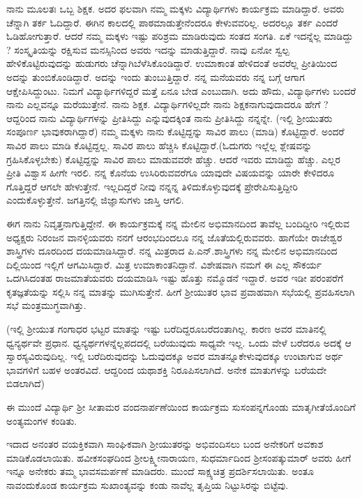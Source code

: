 {ನಾನು ಮೂಲತಃ ಒಬ್ಬ ಶಿಕ್ಷಕ. ಅದರ ಫಲವಾಗಿ ನಮ್ಮ ಮಕ್ಕಳು ವಿದ್ಯಾರ್ಥಿಗಳು ಕಾರ್ಯಕ್ರಮ ಮಾಡಿದ್ದಾರೆ. ಅವರು ಚೆನ್ನಾಗಿ ತರ್ಕ ಓದಿದ್ದಾರೆ. ಈಗಿನ ಕಾಲದಲ್ಲಿ ಪಾಠಮಾಡುತ್ತೇನೆಂದರೂ ಕೇಳುವವರಿಲ್ಲ. ಅದರಲ್ಲೂ ತರ್ಕ ಎಂದರೆ ಓಡಿಹೋಗು\-ತ್ತಾರೆ. ಆದರೆ ನಮ್ಮ ಮಕ್ಕಳು ಇಷ್ಟು ಪರಿಶ್ರಮ ಮಾಡಿರುವುದು ಸಂತದ ಸಂಗತಿ. ಏಕೆ ಇದನ್ನೆಲ್ಲ ಮಾಡಿದ್ದು ? ಸಂಸ್ಕೃತಿಯನ್ನು ರಕ್ಷಿಸುವ ಮನಸ್ಸಿನಿಂದ ಅವರು ಇದನ್ನು ಮಾಡುತ್ತಿದ್ದಾರೆ. ನಾವು ಏನೋ ಸ್ವಲ್ಪ ಹೇಳಿಕೊಟ್ಟಿರುವುದನ್ನು ಹುಡುಗರು ಚೆನ್ನಾಗಿ\break ಬೆಳೆಸಿಕೊಂಡಿದ್ದಾರೆ. ಉಮಾಕಾಂತ ಹೇಳಿದಂತೆ ಅವರೆಲ್ಲ ಪ್ರೀತಿಯಿಂದ ಅದನ್ನು ತುಂಬಿಕೊಂಡಿದ್ದಾರೆ. ಅದನ್ನು ಇಂದು ತುಂಬುತ್ತಿದ್ದಾರೆ. ನನ್ನ ಮನೆಯವರು ನನ್ನ ಬಗ್ಗೆ ಆಗಾಗ ಆಕ್ಷೇಪಿಸಿದ್ದುಂಟು. ನಿಮಗೆ ವಿದ್ಯಾರ್ಥಿಗಳಿದ್ದರೆ ಮತ್ತೆ ಏನೂ ಬೇಡ ಎಂಬುದಾಗಿ. ಅದು ಹೌದು, ವಿದ್ಯಾರ್ಥಿಗಳು ಬಂದರೆ ನಾನು ಎಲ್ಲವನ್ನೂ ಮರೆಯುತ್ತೇನೆ. ನಾನು ಶಿಕ್ಷಕ. ವಿದ್ಯಾರ್ಥಿಗಳಿಲ್ಲದೇ ನಾನು ಶಿಕ್ಷಕನಾಗುವುದಾದರೂ ಹೇಗೆ ? ಆದ್ದರಿಂದ ನಾನು ವಿದ್ಯಾರ್ಥಿಗಳನ್ನು ಪ್ರೀತಿಸಿದ್ದು ಎನ್ನುವುದಕ್ಕಿಂತ ನಾನು ಪ್ರೀತಿಸಿದ್ದು ನನ್ನನ್ನೇ. (ಇಲ್ಲಿ ಶ್ರೀಯುತರು ಸಂಪೂರ್ಣ ಭಾವುಕರಾಗಿದ್ದಾರೆ) ನಮ್ಮ ಮಕ್ಕಳು ನಾನು ಕೊಟ್ಟಿದ್ದನ್ನು ಸಾವಿರ ಪಾಲು (ಮಾಡಿ) ಕೊಟ್ಟಿದ್ದಾರೆ. ಅಂದರೆ ಸಾವಿರ ಪಾಲು ಮಾಡಿ \hbox{ಕೊಟ್ಟಿದ್ದಲ್ಲ}. ಸಾವಿರ ಪಾಲು ಹೆಚ್ಚಿಸಿ ಕೊಟ್ಟಿದ್ದಾರೆ.(ಓದುಗರು ಇಲ್ಲೆಲ್ಲ ಶ್ಲೇಷವನ್ನು ಗ್ರಹಿಸಿಕೊಳ್ಳ\-ಬೇಕು) ಕೊಟ್ಟಿದ್ದನ್ನು ಸಾವಿರ ಪಾಲು ಮಾಡುವವರೇ ಹೆಚ್ಚು. ಆದರೆ ಇವರು ಮಾಡಿದ್ದು ಹೆಚ್ಚು. ಎಲ್ಲರ ಪ್ರೀತಿ ವಿಶ್ವಾಸ ಹೀಗೇ ಇರಲಿ. ನನ್ನ ಕೊನೆಯ ಉಸಿರಿರುವ\-ವರೆಗೂ ಯಾವುದೇ ವಿಷಯವನ್ನು ಯಾರೇ ಕೇಳಿದರೂ ಗೊತ್ತಿದ್ದರೆ ಆಗಲೇ ಹೇಳುತ್ತೇನೆ. ಇಲ್ಲದಿದ್ದರೆ ನೀವು ನನ್ನನ್ನ ತಿಳಿದುಕೊಳ್ಳುವುದಕ್ಕೆ ಪ್ರೇರೇಪಿಸುತ್ತಿದ್ದೀರಿ ಎಂದುಕೊಳ್ಳುತ್ತೇನೆ. ಜಗತ್ತಿನಲ್ಲಿ ಜಿಜ್ಞಾಸುಗಳು ಜಾಸ್ತಿ ಆಗಲಿ. 
\vskip 4pt

ಈಗ ನಾನು ನಿವೃತ್ತನಾಗುತ್ತಿದ್ದೇನೆ. ಈ ಕಾರ್ಯಕ್ರಮಕ್ಕೆ ನನ್ನ ಮೇಲಿನ ಅಭಿಮಾನದಿಂದ ತಾವೆಲ್ಲ  ಬಂದಿದ್ದೀರಿ ಇಲ್ಲಿರುವ ಅಧ್ಯಕ್ಷರು ನಿರಂಜನ ವಾನಳ್ಳಿಯವರು ನನಗೆ ಆರಂಭದಿಂದಲೂ ನನ್ನ ಜೊತೆಯಲ್ಲಿರುವವರು. ಹಾಗೆಯೇ ರಾಜೇಶ್ವರ ಶಾಸ್ತ್ರಿಗಳು ದೂರದಿಂದ ದಯಮಾಡಿಸಿದ್ದಾರೆ. ನನ್ನ ಮಿತ್ರರಾದ ಪಿ.ಎನ್.ಶಾಸ್ತ್ರಿಗಳು ನನ್ನ ಮೇಲಿನ ಅಭಿಮಾನದಿಂದ ದಿಲ್ಲಿಯಿಂದ ಇಲ್ಲಿಗೆ ಆಗಮಿಸಿದ್ದಾರೆ. ಮಿತ್ರ ಉಮಾಕಾಂತನಿದ್ದಾನೆ. ವಿಶೇಷವಾಗಿ ನಮಗೆ ಈ ಎಲ್ಲ ಸೌಕರ್ಯ ಒದಗಿಸಿದಂತಹ ರಾಜಮಾತೆಯವರು ದಯಮಾಡಿಸಿ ಇಷ್ಟು ಹೊತ್ತು ನಮ್ಮೊಡನೆ ಇದ್ದಾರೆ. ಅವರ ಇಡೀ ಪರಂಪರೆಗೆ ಕೃತಜ್ಞತೆಯನ್ನು ಸಲ್ಲಿಸಿ ನನ್ನ ಮಾತನ್ನು ಮುಗಿಸುತ್ತೇನೆ. \enginline{-} ಹೀಗೆ ಶ್ರೀಯುತರ ಭಾವ ಪ್ರವಾಹವಾಗಿ ಸಭೆಯಲ್ಲಿ ಪ್ರವಹಿಸಲಾಗಿ ಸಭೆ ಮಂತ್ರಮುಗ್ಧವಾಗಿತ್ತು.
\vskip 4pt

(ಇಲ್ಲಿ ಶ್ರೀಯುತ ಗಂಗಾಧರ ಭಟ್ಟರ ಮಾತನ್ನು ಇಷ್ಟು ಬರೆದಿದ್ದರೂ\break ಬರೆದಂತಾಗಿಲ್ಲ. ಕಾರಣ ಅವರ ಮಾತಿನಲ್ಲಿ ಧ್ವನ್ಯರ್ಥವೇ ಪ್ರಧಾನ. ಧ್ವನ್ಯರ್ಥಗಳನ್ನೆಲ್ಲ\break ಪದದಲ್ಲಿ ಬರೆಯುವುದು ಸಾಧ್ಯವೇ ಇಲ್ಲ. ಒಂದು ವೇಳೆ ಬರೆದರೂ ಅದಕ್ಕೆ ಆ ಸ್ವಾರಸ್ಯ\-ವಿರುವುದಿಲ್ಲ. ಇಲ್ಲಿ ಬರೆದಿರುವುದನ್ನು ಓದುವುದಕ್ಕೂ ಅವರ ಮಾತನ್ನೂ\break ಕೇಳು\-ವುದಕ್ಕೂ ಉಂಟಾಗುವ ಅರ್ಥ ಭಾವಗಳಿಗೆ ಬಹಳ ಅಂತರವಿದೆ. ಆದ್ದರಿಂದ ಯಥಾಶಕ್ತಿ ನಿರೂಪಿಸಲಾಗಿದೆ. ಅನೇಕ ಮಾತುಗಳನ್ನು ಬರೆಯದೇ ಬಿಡಲಾಗಿದೆ)

ಈ ಮುಂದೆ ವಿದ್ಯಾರ್ಥಿ ಶ್ರೀ ಸೀತಾಮರ ವಂದನಾರ್ಪಣೆಯಿಂದ ಕಾರ್ಯಕ್ರಮ ಸುಸಂಪನ್ನಗೊಂಡು ಮಾತೃಗೀತೆಯೊಂದಿಗೆ ಅಂತ್ಯಮಂಗಳ ಕಂಡಿತು. 

ಇದಾದ ಅನಂತರ ವಯಕ್ತಿಕವಾಗಿ ಸಾಂಘಿಕವಾಗಿ ಶ್ರೀಯುತರನ್ನು ಅಭಿವಂದಿಸಲು ಬಂದ ಅನೇಕರಿಗೆ ಅವಕಾಶ ಮಾಡಿಕೊಡಲಾಯಿತು. ಹವೀಕಸಂಘದಿಂದ ಶ್ರೀಲಕ್ಷ್ಮೀ\-ನಾರಾಯಣ, ಸುಧರ್ಮಾದಿಂದ ಶ್ರೀಸಂಪತ್ಕುಮಾರ್ ಅವರು ಹೀಗೆ ಇನ್ನೂ ಅನೇಕರು ತಮ್ಮ ಭಾವಸಮರ್ಪಣೆ ಮಾಡಿದರು. ಮುಂದೆ ಸಾಕ್ಷ್ಯಚಿತ್ರ ಪ್ರದರ್ಶಿಸಲಾಯಿತು. ಅಂತೂ ನಾವಂದುಕೊಂಡ ಕಾರ್ಯಕ್ರಮ ಸುಖಾಂತ್ಯವನ್ನು ಕಂಡು ನಾವೆಲ್ಲ ತೃಪ್ತಿಯ ನಿಟ್ಟುಸಿರನ್ನು ಬಿಟ್ಟೆವು.

}
